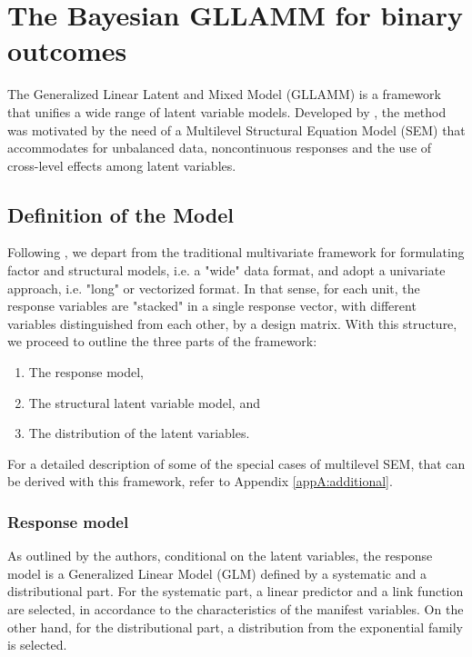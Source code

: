 \chapter{The Bayesian GLLAMM for binary outcomes} \label{chap:framework}

The Generalized Linear Latent and Mixed Model (GLLAMM) is a framework that unifies a wide range of latent variable models. Developed by \citet{Rabe_et_al_2004a, Rabe_et_al_2004b, Rabe_et_al_2004c, Skrondal_et_al_2004a, Rabe_et_al_2012}, the method was motivated by the need of a Multilevel Structural Equation Model (SEM) that accommodates for unbalanced data, noncontinuous responses and the use of cross-level effects among latent variables. 


\section{Definition of the Model} \label{sect:definition}
Following \citet{Rabe_et_al_2004a, Rabe_et_al_2012}, we depart from the traditional multivariate framework for formulating factor and structural models, i.e. a "wide" data format, and adopt a univariate approach, i.e. "long" or vectorized format. In that sense, for each unit, the response variables are "stacked" in a single response vector, with different variables distinguished from each other, by a design matrix. With this structure, we proceed to outline the three parts of the framework: 
\begin{enumerate}
	\item The response model, 
	\item The structural latent variable model, and 
	\item The distribution of the latent variables. 
\end{enumerate}
For a detailed description of some of the special cases of multilevel SEM, that can be derived with this framework, refer to Appendix \ref{appA:additional}.


\subsection{Response model} \label{s_sect:response}
As outlined by the authors, conditional on the latent variables, the response model is a Generalized Linear Model (GLM) defined by a systematic and a distributional part. For the systematic part, a linear predictor and a link function are selected, in accordance to the characteristics of the manifest variables. On the other hand, for the distributional part, a distribution from the exponential family is selected.


